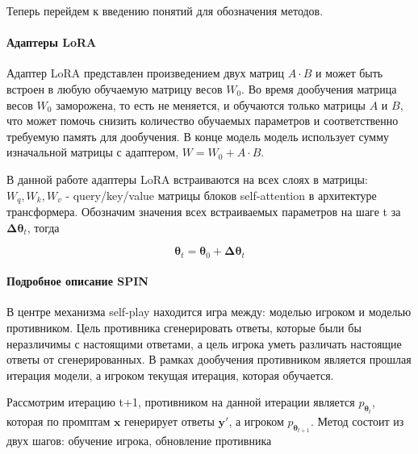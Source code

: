 \documentclass[12pt, twoside]{article}
\newcommand{\bx}{\mathbf{x}}
\newcommand{\by}{\mathbf{y}}
\newcommand{\btheta}{\boldsymbol{\theta}}
\newcommand{\bDelta}{\boldsymbol{\Delta}}
\begin{document}
Теперь перейдем к введению понятий для обозначения методов.

\paragraph{Адаптеры LoRA}
Адаптер LoRA представлен произведением двух матриц $A \cdot B$ и может быть встроен в любую обучаемую матрицу весов $W_0$. Во время дообучения матрица весов $W_0$ заморожена, то есть не меняется, и обучаются только матрицы $A$ и $B$, что может помочь снизить количество обучаемых параметров и соответственно требуемую память для дообучения. В конце модель модель использует сумму изначальной матрицы с адаптером, $W = W_0 + A \cdot B$.

В данной работе адаптеры LoRA встраиваются на всех слоях в матрицы: $W_q, W_k, W_v$ - query/key/value матрицы блоков self-attention в архитектуре трансформера. Обозначим значения всех встраиваемых параметров на шаге t за $\bDelta\btheta_t$, тогда

$$\btheta_t = \btheta_0 + \bDelta\btheta_t$$

\paragraph{Подробное описание SPIN}

В центре механизма self-play находится игра между: моделью игроком и моделью противником. Цель противника сгенерировать ответы, которые были бы неразличимы с настоящими ответами, а цель игрока уметь различать настоящие ответы от сгенерированных. В рамках дообучения противником является прошлая итерация модели, а игроком текущая итерация, которая обучается.

Рассмотрим итерацию t+1, противником на данной итерации является $p_{\btheta_t}$, которая по промптам $\bx$ генерирует ответы $\by'$, а игроком $p_{\btheta_{t+1}}$. Метод состоит из двух шагов: обучение игрока, обновление противника
\end{document}
